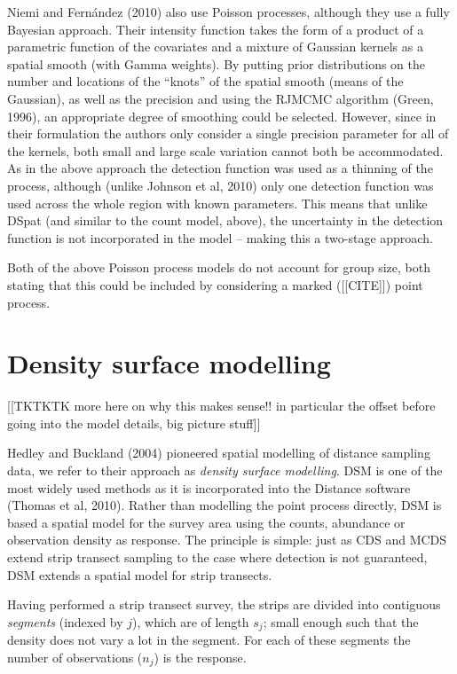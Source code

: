 \documentclass[useAMS,referee]{biom}
\begin{document}
Niemi and Fern\'andez (2010) also use Poisson processes, although they use a fully Bayesian approach. Their intensity function takes the form of a product of a parametric function of the covariates and a mixture of Gaussian kernels as a spatial smooth (with Gamma weights). By putting prior distributions on the number and locations of the ``knots'' of the spatial smooth (means of the Gaussian), as well as the precision and using the RJMCMC algorithm (Green, 1996), an appropriate degree of smoothing could be selected. However, since in their formulation the authors only consider a single precision parameter for all of the kernels, both small and large scale variation cannot both be accommodated. As in the above approach the detection function was used as a thinning of the process, although (unlike Johnson et al, 2010) only one detection function was used across the whole region with known parameters. This means that unlike DSpat (and similar to the count model, above), the uncertainty in the detection function is not incorporated in the model -- making this a two-stage approach.


Both of the above Poisson process models do not account for group size, both stating that this could be included by considering a marked ([[CITE]]) point process.


\section{Density surface modelling}
\label{s:dsm}

[[TKTKTK more here on why this makes sense!! in particular the offset before going into the model details, big picture stuff]]

Hedley and Buckland (2004) pioneered spatial modelling of distance sampling data, we refer to their approach as \textit{density surface modelling}. DSM is one of the most widely used methods as it is incorporated into the Distance software (Thomas et al, 2010). Rather than modelling the point process directly, DSM is based a spatial model for the survey area using the counts, abundance or observation density as response. The principle is simple: just as CDS and MCDS extend strip transect sampling to the case where detection is not guaranteed, DSM extends a spatial model for strip transects.

Having performed a strip transect survey, the strips are divided into contiguous \textit{segments} (indexed by $j$), which are of length $s_j$; small enough such that the density does not vary a lot in the segment. For each of these segments the number of observations ($n_j$) is the response.
\end{document}
